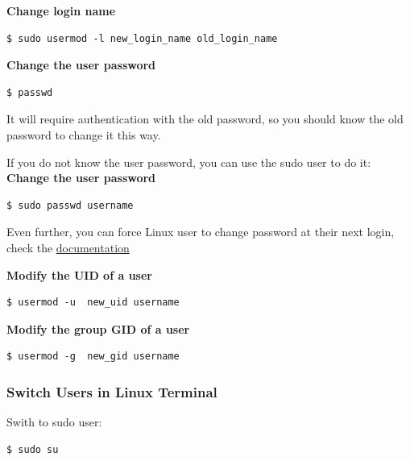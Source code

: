 \documentclass{article}
\newenvironment{blocktemplateI}[1]{%
    \tcolorbox[beamer,%
    noparskip,breakable,
    colframe=Violet,%
    colbacklower=Black,%
    title=#1]}%
    {\endtcolorbox}
\newenvironment{blocktemplateIII}[1]{%
    \tcolorbox[beamer,%
    noparskip,breakable,
    ,colframe=Red,%
    colbacklower=LimeGreen!75!LightGreen,%
    title=#1]}%
    {\endtcolorbox}
\newenvironment{codetemplate}[1][]{%
  \mybasecolorbox[#1]
  \itshape
}{%
  \endmybasecolorbox
}
\begin{document}
\textbf{Change login name}
\begin{codetemplate}{}
\begin{verbatim}
$ sudo usermod -l new_login_name old_login_name
\end{verbatim}
\end{codetemplate}

\textbf{Change the user password}
\begin{codetemplate}{}
\begin{verbatim}
$ passwd
\end{verbatim}
\end{codetemplate}

\begin{blocktemplateIII}{WARNING}
It will require authentication with the old password, so you should know the old password to change it this way.

If you do not know the user password, you can use the sudo user to do it:
\textbf{Change the user password}
\begin{codetemplate}{}
\begin{verbatim}
$ sudo passwd username
\end{verbatim}
\end{codetemplate}
\end{blocktemplateIII}

\begin{blocktemplateI}{NOTE}
Even further, you can force Linux user to change password at their next login, check the \href{https://www.cyberciti.biz/faq/linux-set-change-password-how-to/}{documentation}
\end{blocktemplateI}

\textbf{Modify the UID of a user}
\begin{codetemplate}{}
\begin{verbatim}
$ usermod -u  new_uid username
\end{verbatim}
\end{codetemplate}

\textbf{Modify the group GID of a user}
\begin{codetemplate}{}
\begin{verbatim}
$ usermod -g  new_gid username
\end{verbatim}
\end{codetemplate}

\subsubsection{Switch Users in Linux Terminal}
Swith to sudo user:
\begin{codetemplate}{}
\begin{verbatim}
$ sudo su
\end{verbatim}
\end{codetemplate}
\end{document}

